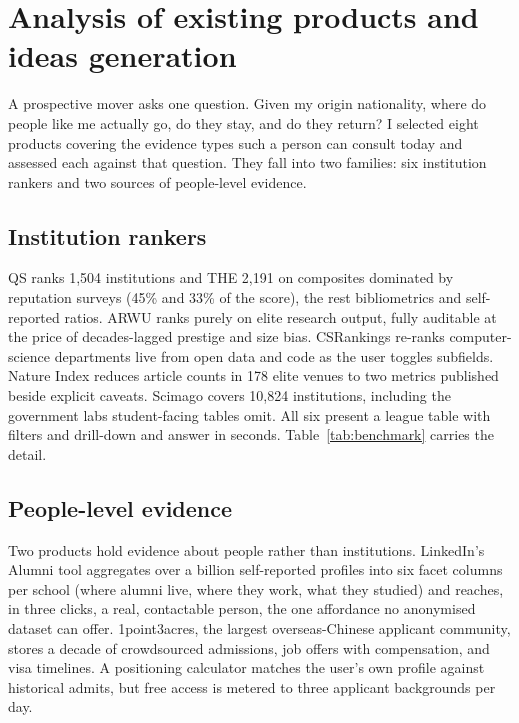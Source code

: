 \section{Analysis of existing products and ideas generation}

A prospective mover asks one question. Given my origin nationality, where do people like me actually go, do they stay, and do they return? I selected eight products covering the evidence types such a person can consult today and assessed each against that question. They fall into two families: six institution rankers and two sources of people-level evidence.

\subsection{Institution rankers}

QS ranks 1,504 institutions and THE 2,191 on composites dominated by reputation surveys (45\% and 33\% of the score), the rest bibliometrics and self-reported ratios. ARWU ranks purely on elite research output, fully auditable at the price of decades-lagged prestige and size bias. CSRankings re-ranks computer-science departments live from open data and code as the user toggles subfields. Nature Index reduces article counts in 178 elite venues to two metrics published beside explicit caveats. Scimago covers 10,824 institutions, including the government labs student-facing tables omit. All six present a league table with filters and drill-down and answer in seconds. Table~\ref{tab:benchmark} carries the detail.

\subsection{People-level evidence}

Two products hold evidence about people rather than institutions. LinkedIn's Alumni tool aggregates over a billion self-reported profiles into six facet columns per school (where alumni live, where they work, what they studied) and reaches, in three clicks, a real, contactable person, the one affordance no anonymised dataset can offer. 1point3acres, the largest overseas-Chinese applicant community, stores a decade of crowdsourced admissions, job offers with compensation, and visa timelines. A positioning calculator matches the user's own profile against historical admits, but free access is metered to three applicant backgrounds per day.

